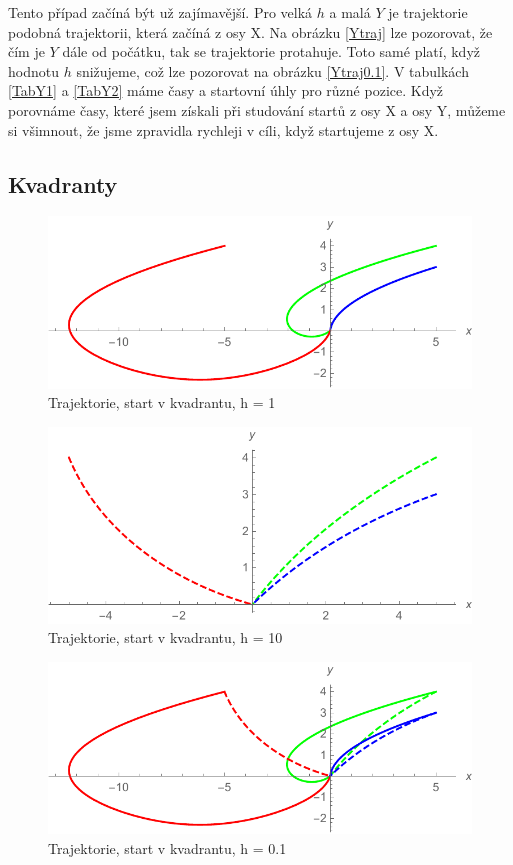 \documentclass[reqno, a4paper]{amsart}
\numberwithin{equation}{section}
\begin{document}
Tento případ začíná být už zajímavější. Pro velká $h$ a malá $Y$ je trajektorie podobná trajektorii, která začíná z osy X. Na obrázku \eqref{Ytraj} lze pozorovat, že čím je $Y$ dále od počátku, tak se trajektorie protahuje. Toto samé platí, když hodnotu $h$ snižujeme, což lze pozorovat na obrázku \eqref{Ytraj0.1}. V tabulkách \eqref{TabY1} a \eqref{TabY2} máme časy a startovní úhly pro různé pozice. Když porovnáme časy, které jsem získali při studování startů z osy X a osy Y, můžeme si všimnout, že jsme zpravidla rychleji v cíli, když startujeme z osy X. 
\subsection{Kvadranty}
\label{sec: Kvad}
\begin{figure}
\includegraphics[scale=0.7]{figures/Kvad2.pdf}
\caption{Trajektorie, start v kvadrantu, h = 1}
\label{Ytraj}
\end{figure}
\begin{figure}
\includegraphics[scale=0.7]{figures/Kvad3.pdf}
\caption{Trajektorie, start v kvadrantu, h = 10}
\label{Ytraj0.1}
\end{figure}
\begin{figure}
\includegraphics[scale=0.7]{figures/Kvad1.pdf}
\caption{Trajektorie, start v kvadrantu, h = 0.1}
\label{Ytraj0.1}
\end{figure}
\end{document}
